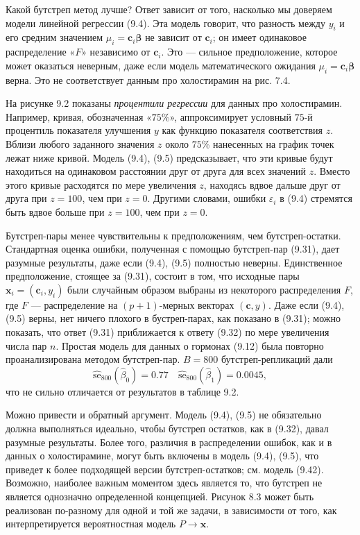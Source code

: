 Какой бутстреп метод лучше? Ответ зависит от того, насколько мы доверяем модели линейной регрессии (9.4). Эта модель говорит, что разность между $y_i$ и его средним значением $\mu_i = \textbf{c}_i \bm{\beta}$ не зависит от $\textbf{c}_i$; он имеет одинаковое распределение «$F$» независимо от $\textbf{c}_i$. Это --- сильное предположение, которое может оказаться неверным, даже если модель математического ожидания $\mu_i = \textbf{c}_i \bm{\beta}$ верна. Это не соответствует данным про холостирамин на рис. 7.4.

На рисунке 9.2 показаны \textit{процентили регрессии} для данных про холостирамин. Например, кривая, обозначенная «$75$\%», аппроксимирует условный $75$-й процентиль показателя улучшения $y$ как функцию показателя соответствия $z$. Вблизи любого заданного значения $z$ около $75$\% нанесенных на график точек лежат ниже кривой. Модель (9.4), (9.5) предсказывает, что эти кривые будут находиться на одинаковом расстоянии друг от друга для всех значений $z$. Вместо этого кривые расходятся по мере увеличения $z$, находясь вдвое дальше друг от друга при $z = 100$, чем при $z = 0$. Другими словами, ошибки $\varepsilon_i$ в (9.4) стремятся быть вдвое больше при $z = 100$, чем при $z = 0$.

Бутстреп-пары менее чувствительны к предположениям, чем бутстреп-остатки. Стандартная оценка ошибки, полученная с помощью бутстреп-пар (9.31), дает разумные результаты, даже если (9.4), (9.5) полностью неверны. Единственное предположение, стоящее за (9.31), состоит в том, что исходные пары $\textbf{x}_i = (\textbf{c}_i, y_i)$ были случайным образом выбраны из некоторого распределения $F$, где $F$ --- распределение на $(p+1)$-мерных векторах $(\textbf{c}, y)$. Даже если (9.4), (9.5) верны, нет ничего плохого в бустреп-парах, как показано в (9.31); можно показать, что ответ (9.31) приближается к ответу (9.32) по мере увеличения числа пар $n$. Простая модель для данных о гормонах (9.12) была повторно проанализирована методом бутстреп-пар. $B = 800$ бутстреп-репликаций дали
\begin{equation}
	\hat{\text{se}}_{800} (\hat{\beta}_0) = 0.77 \quad \hat{\text{se}}_{800}(\hat{\beta}_1) = 0.0045,
\end{equation}
что не сильно отличается от результатов в таблице 9.2.

Можно привести и обратный аргумент. Модель (9.4), (9.5) не обязательно должна выполняться идеально, чтобы бутстреп остатков, как в (9.32), давал разумные результаты. Более того, различия в распределении ошибок, как и в данных о холостирамине, могут быть включены в модель (9.4), (9.5), что приведет к более подходящей версии бутстреп-остатков; см. модель (9.42). Возможно, наиболее важным моментом здесь является то, что бутстреп не является однозначно определенной концепцией. Рисунок 8.3 может быть реализован по-разному для одной и той же задачи, в зависимости от того, как интерпретируется вероятностная модель $P \to \textbf{x}$.

